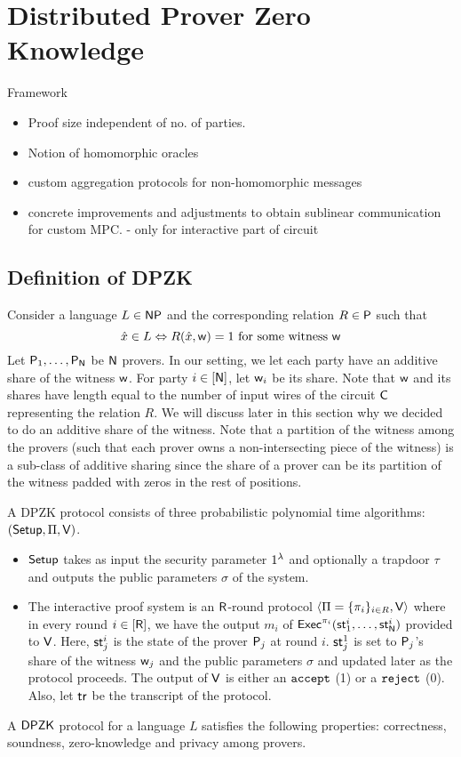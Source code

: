 \section{Distributed Prover Zero Knowledge}
Framework
\begin{itemize}
\item Proof size independent of no. of parties.
\item Notion of homomorphic oracles
\item custom aggregation protocols for non-homomorphic messages
\item concrete improvements and adjustments to obtain sublinear communication for custom MPC. - only for interactive part of circuit
\end{itemize}

\subsection{Definition of DPZK}
Consider a language $L \in \mathsf{NP}$ and the corresponding relation $R \in \mathsf{P}$ such that
\[
\hat{x} \in L \Leftrightarrow R(\hat{x}, \mathsf{w})=1 \text{ for some witness } \mathsf{w}
\]
Let $\mathsf{P}_1, \ldots, \mathsf{P}_{\mathsf{N}}$ be $\mathsf{N}$ provers. In our setting, we let each party have an additive share of the witness $\mathsf{w}$. For party $i \in [\mathsf{N}]$, let $\mathsf{w}_i$ be its share.  Note that $\mathsf{w}$ and its shares have length equal to the number of input wires of the circuit $\mathsf{C}$ representing the relation $R$. We will discuss later in this section why we decided to do an additive share of the witness. Note that a partition of the witness among the provers (such that each prover owns a non-intersecting piece of the witness) is a sub-class of additive sharing since the share of a prover can be its partition of the witness padded with zeros in the rest of positions.


A DPZK protocol consists of three probabilistic polynomial time algorithms: $(\mathsf{Setup}, \Pi, \mathsf{V})$. 
\begin{itemize}
\item $\mathsf{Setup}$ takes as input the security parameter $1^{\lambda}$ and optionally a trapdoor $\tau$ and outputs the public parameters $\sigma$ of the system.
\item The interactive proof system is an $\mathsf{R}$-round protocol $\langle \Pi = \{\pi_i\}_{i \in R}, \mathsf{V} \rangle$ where in every round $i \in [\mathsf{R}]$, we have the output $m_i$ of $\mathsf{Exec}^{\pi_i}(\mathsf{st}^i_1, \ldots, \mathsf{st}^i_{\mathsf{N}})$ provided to $\mathsf{V}$. Here, $\mathsf{st}^i_j$ is the state of the prover $\mathsf{P}_j$ at round $i$. $\mathsf{st}^1_j$ is set to $\mathsf{P}_j$'s share of the witness $\mathsf{w}_j$ and the public parameters $\sigma$ and updated later as the protocol proceeds. The output of $\mathsf{V}$ is either an $\tt accept$ (1) or a $\tt{reject}$ (0). Also, let $\mathsf{tr}$ be the transcript of the protocol.
\end{itemize}
A $\mathsf{DPZK}$ protocol for a language $L$ satisfies the following properties: 
correctness, soundness, zero-knowledge and privacy among provers.
